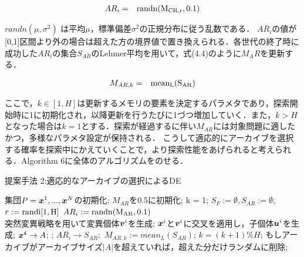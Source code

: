 \documentclass[a4paper,11pt,oneside,openany]{jsbook}
\def\vector#1{\mbox{\boldmath $#1$}}
\begin{document}
\begin{eqnarray}
  AR_i & = & \rm{randn}(M_{CR,r}, 0.1)
\end{eqnarray}

$randn(\mu,\sigma^2)$ は平均$\mu$，標準偏差$\sigma^2$の正規分布に従う乱数である．
$AR_i$の値が[0,1]区間より外の場合は超えた方の境界値で置き換えられる．各世代の終了時に成功した$AR_i$の集合$S_{AR}$のLehmer平均を用いて，式(4.4)のように$M_AR$を更新する．

\begin{eqnarray}
  M_{AR,k} & = & \rm{mean_L}(S_{AR})
\end{eqnarray}

ここで，$k \in [1,H]$は更新するメモリの要素を決定するパラメタであり，探索開始時に1に初期化され，以降更新を行うたびに1づつ増加していく．また，$k > H$となった場合は$k = 1$とする．探索が経過するに伴い$M_{AR}$には対象問題に適したかつ，多様なパラメタ設定が保持される．
こうして適応的にアーカイブを選択する確率を探索中にかえていくことで，より探索性能をあげられると考えられる．Algorithm 6に全体のアルゴリズムをのせる．

\newpage
\begin{algorithm}
\caption{提案手法 2:適応的なアーカイブの選択によるDE}
\label{alg:pbnf}
\begin{algorithmic}
\STATE 集団$P={\vector{x}^1,...,\vector{x}^N}$の初期化;
\STATE $M _{AR}$を0.5に初期化;
\STATE k = 1;
    \STATE $S_F := \emptyset, S_{AR} := \emptyset$;
        \STATE $r := \rm{randi}[1,H]$
        \STATE $AR_i := \rm{randn}(M_{AR}, 0.1)$ \\
        \STATE 突然変異戦略を用いて変異個体{$\vector{v}^i$}を生成;
        \STATE $\vector{x}^i$と$\vector{v}^i$に交叉を適用し，子個体$\vector{u}^i$を生成;
     \ENDFOR
        \IF {$f(\vector{u}^i) \leqq f(\vector{x}^i)$}
            \STATE $\vector{x^i} \rightarrow {A}$;
            \STATE {$\vector{x}^i := \vector{u}^i$};
            \STATE $AR_i \rightarrow S_{AR};$
        \ENDIF
    \ENDFOR
        \STATE $M_{AR,k}  :=  mean_L(S_{AR})$;
        \STATE $k = (k+1) \% H$;
    \ENDIF
    \STATE もしアーカイブがアーカイブサイズ$|A|$を超えていれば，超えた分だけランダムに削除;
\ENDWHILE
\end{algorithmic}
\end{algorithm}
\newpage
\end{document}
